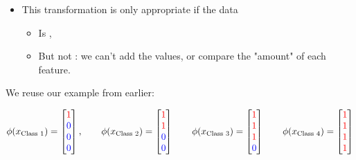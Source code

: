 \begin{definition}
                    \subsecdiv

                    \begin{itemize}
                        \item This transformation is only appropriate if the data 
                            \begin{itemize}
                                \item Is ,
                                \item But not : we can't add the values, or compare the "amount" of each feature.
                            \end{itemize}
                    \end{itemize}
                \end{definition}

                \miniex We reuse our example from earlier: 

                \begin{equation*}
                    \phi(x_{\text{Class 1}}) =
                    \begin{bmatrix}
                    \textcolor{red}{1} \\ \textcolor{blue}{0} \\ \textcolor{blue}{0} \\ \textcolor{blue}{0}
                    \end{bmatrix},
                    \qquad 
                    \phi(x_{\text{Class 2}}) =
                    \begin{bmatrix}
                    \textcolor{red}{1} \\ \textcolor{red}{1} \\ \textcolor{blue}{0} \\ \textcolor{blue}{0}
                    \end{bmatrix}
                    \qquad 
                    \phi(x_{\text{Class 3}}) =
                    \begin{bmatrix}
                    \textcolor{red}{1} \\ \textcolor{red}{1} \\ \textcolor{red}{1} \\ \textcolor{blue}{0}
                    \end{bmatrix}
                    \qquad 
                    \phi(x_{\text{Class 4}}) =
                    \begin{bmatrix}
                    \textcolor{red}{1} \\ \textcolor{red}{1} \\ \textcolor{red}{1} \\ \textcolor{red}{1}
                    \end{bmatrix}
                    \end{equation*}

